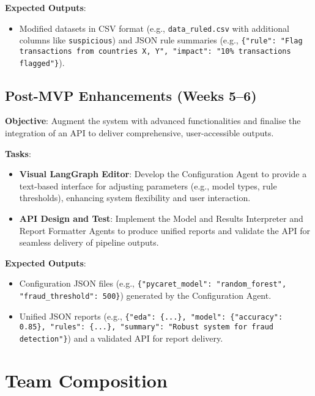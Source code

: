 \documentclass{article}
\begin{document}
\textbf{Expected Outputs}:
\begin{itemize}[label=--]
    \item Modified datasets in CSV format (e.g., \texttt{data\_ruled.csv} with additional columns like \texttt{suspicious}) and JSON rule summaries (e.g., \texttt{\{"rule": "Flag transactions from countries X, Y", "impact": "10\% transactions flagged"\}}).
\end{itemize}

\subsection{Post-MVP Enhancements (Weeks 5--6)}
\textbf{Objective}: Augment the system with advanced functionalities and finalise the integration of an API to deliver comprehensive, user-accessible outputs.

\textbf{Tasks}:
\begin{itemize}[label=--]
    \item \textbf{Visual LangGraph Editor}: Develop the Configuration Agent to provide a text-based interface for adjusting parameters (e.g., model types, rule thresholds), enhancing system flexibility and user interaction.
    \item \textbf{API Design and Test}: Implement the Model and Results Interpreter and Report Formatter Agents to produce unified reports and validate the API for seamless delivery of pipeline outputs.
\end{itemize}

\textbf{Expected Outputs}:
\begin{itemize}[label=--]
    \item Configuration JSON files (e.g., \texttt{\{"pycaret\_model": "random\_forest", "fraud\_threshold": 500\}}) generated by the Configuration Agent.
    \item Unified JSON reports (e.g., \texttt{\{"eda": \{...\}, "model": \{"accuracy": 0.85\}, "rules": \{...\}, "summary": "Robust system for fraud detection"\}}) and a validated API for report delivery.
\end{itemize}

\section{Team Composition}
\end{document}
